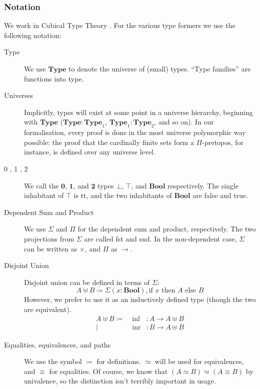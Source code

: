 \subsubsection{Notation}
We work in Cubical Type Theory \cite{cohenCubicalTypeTheory2016}.
For the various type formers we use the following notation:
\begin{description}
  \item[Type] We use \(\mathbf{Type}\) to denote the universe of (small) types.
    ``Type families'' are functions into type.
  \item[Universes]
    Implicitly, types will exist at some point in a universe hierarchy,
    beginning with \(\mathbf{Type}\) (\(\mathbf{Type} : \mathbf{Type}_1\),
    \(\mathbf{Type}_1 : \mathbf{Type}_2\), and so on).
    In our formalisation, every proof is done in the most universe polymorphic
    way possible: the proof that the cardinally finite sets form a
    \(\Pi\)-pretopos, for instance, is defined over any universe level.
  \item[0 , 1 , 2] We call the \(\mathbf{0}\), \(\mathbf{1}\), and
    \(\mathbf{2}\) types \(\bot\), \(\top\), and \(\mathbf{Bool}\) respectively.
    The single inhabitant of \(\top\) is tt, and the two inhabitants of
    \(\mathbf{Bool}\) are false and true.
  \item[Dependent Sum and Product] We use \(\Sigma\) and \(\Pi\) for the
    dependent sum and product, respectively.
    The two projections from \(\Sigma\) are called fst and snd.
    In the non-dependent case, \(\Sigma\) can be written as \(\times\), and
    \(\Pi\) as \(\rightarrow\).
  \item[Disjoint Union] Disjoint union can be defined in terms of \(\Sigma\):
    \begin{equation}
      A \uplus B \coloneqq \Sigma(x : \mathbf{Bool}) , \text{if } x \text{ then } A \text{ else } B
    \end{equation}
    However, we prefer to use it as an inductively defined type (though the two
    are equivalent).
    \begin{equation}
      \begin{aligned}
        A \uplus B \coloneqq & \;
        \text{inl} &: A \rightarrow A \uplus B \\
        | & \;  \text{inr} &: B \rightarrow A \uplus B
      \end{aligned}
    \end{equation}
  \item[Equalities, equivalences, and paths] We use the symbol \(\coloneqq\)
    for definitions.
    \(\simeq\) will be used for equivalences, and \(\equiv\) for equalities.
    Of course, we know that \((A \simeq B) \simeq (A \equiv B)\) by univalence,
    so the distinction isn't terribly important in usage.
\end{description}
